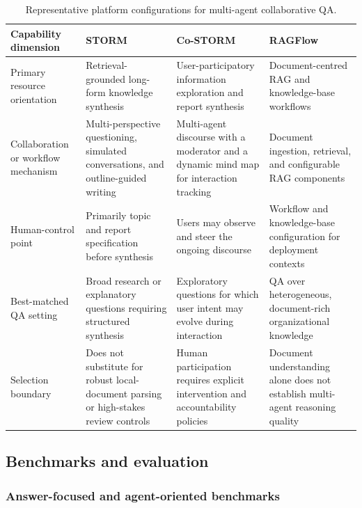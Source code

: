 \documentclass[a4paper,fleqn]{cas-dc}
\begin{document}
\begin{table}[t]
  \centering
  \caption{Representative platform configurations for multi-agent collaborative QA.}
  \label{tab:platform_capability_matrix}
  \small
  \begin{tabularx}{\textwidth}{p{3.0cm} X X X}
    \toprule
    \textbf{Capability dimension} & \textbf{STORM} & \textbf{Co-STORM} & \textbf{RAGFlow} \\
    \midrule
    Primary resource orientation &
    Retrieval-grounded long-form knowledge synthesis &
    User-participatory information exploration and report synthesis &
    Document-centred RAG and knowledge-base workflows \\
    Collaboration or workflow mechanism &
    Multi-perspective questioning, simulated conversations, and outline-guided writing &
    Multi-agent discourse with a moderator and a dynamic mind map for interaction tracking &
    Document ingestion, retrieval, and configurable RAG components \\
    Human-control point &
    Primarily topic and report specification before synthesis &
    Users may observe and steer the ongoing discourse &
    Workflow and knowledge-base configuration for deployment contexts \\
    Best-matched QA setting &
    Broad research or explanatory questions requiring structured synthesis &
    Exploratory questions for which user intent may evolve during interaction &
    QA over heterogeneous, document-rich organizational knowledge \\
    Selection boundary &
    Does not substitute for robust local-document parsing or high-stakes review controls &
    Human participation requires explicit intervention and accountability policies &
    Document understanding alone does not establish multi-agent reasoning quality \\
    \bottomrule
  \end{tabularx}
\end{table}

\subsection{Benchmarks and evaluation}
\label{sec:benchmark_datasets}
\label{sec:automated_evaluation_tools}

\subsubsection{Answer-focused and agent-oriented benchmarks}
\label{sec:benchmark_types}
\end{document}
